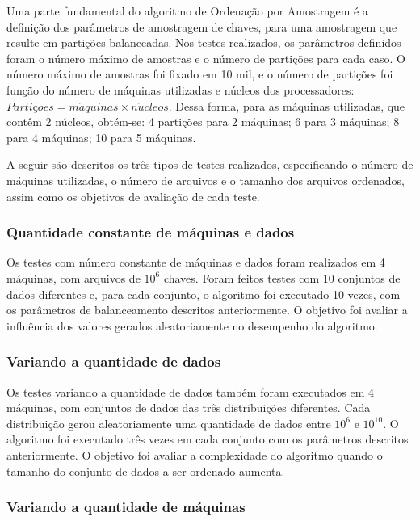 Uma parte fundamental do algoritmo de Ordenação por Amostragem é a definição dos parâmetros de amostragem de chaves, para uma amostragem que resulte em partições balanceadas. Nos testes realizados, os parâmetros definidos foram o número máximo de amostras e o número de partições para cada caso.  O número máximo de amostras foi fixado em 10 mil, e o número de partições foi função do número de máquinas utilizadas e núcleos dos processadores: \mbox{$ Parti \text{\c{c}} \tilde{o}es = m\acute{a}quinas \times n\acute{u}cleos $}. Dessa forma, para as máquinas utilizadas, que contêm 2 núcleos, obtém-se: 4 partições para 2 máquinas; 6 para 3 máquinas; 8 para 4 máquinas; 10 para 5 máquinas.

A seguir são descritos os três tipos de testes realizados, especificando o número de máquinas utilizadas, o número de arquivos e o tamanho dos arquivos ordenados, assim como os objetivos de avaliação de cada teste.



\subsubsection{Quantidade constante de máquinas e dados} 

Os testes com número constante de máquinas e dados foram realizados em 4 máquinas, com arquivos de $10^{6}$ chaves. Foram feitos testes com 10 conjuntos de dados diferentes e, para cada conjunto, o algoritmo foi executado 10 vezes, com os parâmetros de balanceamento descritos anteriormente.  O objetivo foi avaliar a influência dos valores gerados aleatoriamente no desempenho do algoritmo. 


\subsubsection{Variando a quantidade de dados}
 
 Os testes variando a quantidade de dados também foram executados em 4 máquinas, com conjuntos de dados das três distribuições diferentes. Cada distribuição gerou aleatoriamente uma quantidade de dados entre $10^{6}$ e $10^{10}$. O algoritmo foi executado três vezes em cada conjunto com os parâmetros descritos anteriormente. O objetivo foi avaliar a complexidade do algoritmo quando o tamanho do conjunto de dados a ser ordenado aumenta.
 
\subsubsection{Variando a quantidade de máquinas}

